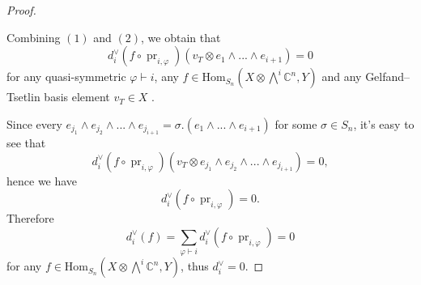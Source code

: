 \documentclass[11pt]{amsart}
\numberwithin{equation}{section}
\theoremstyle{definition}
\renewcommand{\phi}{\varphi}
\begin{document}
\begin{proof}
\begin{enumerate}
         
    \end{enumerate}
       
      Combining $(1)$ and $(2)$, we obtain that
       \[
       d_{i}^{\vee}(f\circ\operatorname{pr}_{i,\phi})(v_T\otimes e_{1}\wedge...\wedge e_{i+1})=0
       \]
       for any quasi-symmetric $\phi\vdash i$, any $f\in\mathrm{Hom}_{S_n}(X\otimes \bigwedge^i \mathbb C^n, Y)$ and any Gelfand–Tsetlin basis element $v_{T}\in X$ .
       
Since every $e_{j_{1}}\wedge e_{j_{2}}\wedge...\wedge e_{j_{i+1}}=\sigma.(e_{1}\wedge...\wedge e_{i+1})$ for some $\sigma\in S_{n}$, it's easy to see that
\[d_{i}^{\vee}(f\circ\operatorname{pr}_{i,\phi})(v_{T}\otimes e_{j_{1}}\wedge e_{j_{2}}\wedge...\wedge e_{j_{i+1}})=0,
\] 
 hence we have
 \[
 d_{i}^{\vee}(f\circ\operatorname{pr}_{i,\phi})=0.
 \] 
 Therefore \[
 d_{i}^{\vee}(f)=\sum_{\phi\vdash i}d_{i}^{\vee}(f\circ\operatorname{pr}_{i,\phi})=0
 \]
 for any $f\in \mathrm{Hom}_{S_n}(X\otimes \bigwedge^i \mathbb C^n, Y)$, thus $d_{i}^{\vee}=0$.
\end{proof}
\end{document}

